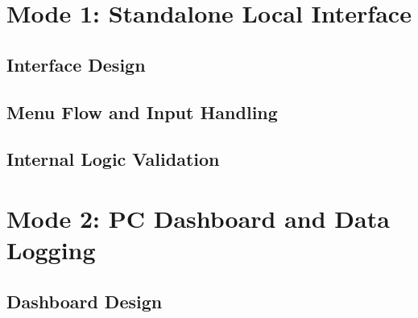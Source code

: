 \section{Mode 1: Standalone Local Interface}
\label{sec:agit-mode1}

\subsection{Interface Design}
\label{subsec:agit-hmi}


\subsection{Menu Flow and Input Handling}
\label{subsec:agit-menu}


\subsection{Internal Logic Validation}
\label{subsec:agit-mode1-test}



\section{Mode 2: PC Dashboard and Data Logging}
\label{sec:agit-mode2}

\subsection{Dashboard Design}
\label{subsec:agit-dashboard}


